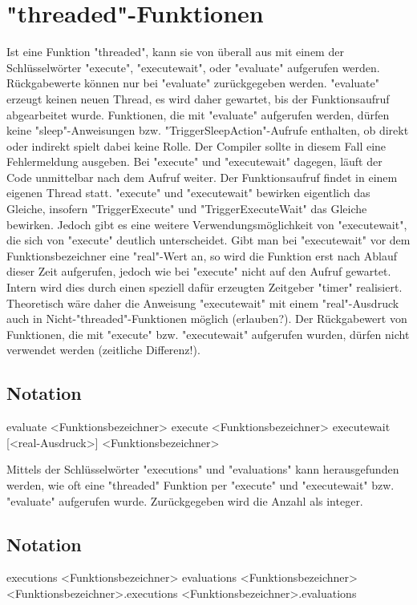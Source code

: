\section{"threaded"-Funktionen}
Ist eine Funktion "threaded", kann sie von überall aus mit einem der Schlüsselwörter "execute", "executewait", oder "evaluate" aufgerufen werden.
Rückgabewerte können nur bei "evaluate" zurückgegeben werden.
"evaluate" erzeugt keinen neuen Thread, es wird daher gewartet, bis der Funktionsaufruf abgearbeitet wurde. Funktionen, die mit
"evaluate" aufgerufen werden, dürfen keine "sleep"-Anweisungen bzw. "TriggerSleepAction"-Aufrufe enthalten, ob direkt oder indirekt spielt dabei keine Rolle.
Der Compiler sollte in diesem Fall eine Fehlermeldung ausgeben.
Bei "execute" und "executewait" dagegen, läuft der Code unmittelbar nach dem Aufruf weiter. Der Funktionsaufruf findet in einem eigenen
Thread statt.
"execute" und "executewait" bewirken eigentlich das Gleiche, insofern "TriggerExecute" und "TriggerExecuteWait" das Gleiche bewirken.
Jedoch gibt es eine weitere Verwendungsmöglichkeit von "executewait", die sich von "execute" deutlich unterscheidet.
Gibt man bei "executewait" vor dem Funktionsbezeichner eine "real"-Wert an, so wird die Funktion erst nach Ablauf dieser Zeit
aufgerufen, jedoch wie bei "execute" nicht auf den Aufruf gewartet.
Intern wird dies durch einen speziell dafür erzeugten Zeitgeber "timer" realisiert. Theoretisch wäre daher die Anweisung "executewait" mit einem
"real"-Ausdruck auch in Nicht-"threaded"-Funktionen möglich (erlauben?).
Der Rückgabewert von Funktionen, die mit "execute" bzw. "executewait" aufgerufen wurden, dürfen nicht verwendet werden (zeitliche Differenz!).

\subsection{Notation}
evaluate <Funktionsbezeichner>
execute <Funktionsbezeichner>
executewait [<real-Ausdruck>] <Funktionsbezeichner>

Mittels der Schlüsselwörter "executions" und "evaluations" kann herausgefunden werden, wie oft eine "threaded" Funktion per "execute" und "executewait"
bzw. "evaluate" aufgerufen wurde.
Zurückgegeben wird die Anzahl als integer.

\subsection{Notation}
executions <Funktionsbezeichner>
evaluations <Funktionsbezeichner>
<Funktionsbezeichner>.executions
<Funktionsbezeichner>.evaluations
 
